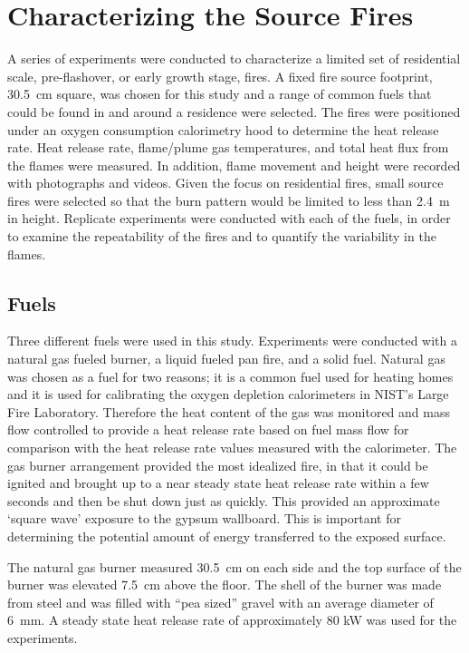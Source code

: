\documentclass[twoside]{uocthesis}
\begin{document}
{\chapter{Characterizing the Source Fires}
\label{chapter:Characterizing the Source Fires}

A series of experiments were conducted to characterize a limited set of  residential scale, pre-flashover, or early growth stage, fires.  A fixed fire source footprint, 30.5~cm square, was chosen for this study and a range of common fuels that could be found in and around a residence were selected.  The fires were positioned under an oxygen consumption calorimetry hood to determine the heat release rate.  Heat release rate, flame/plume gas temperatures, and total heat flux from the flames were measured.  In addition, flame movement and height were recorded with photographs and videos.  Given the focus on residential fires, small source fires were selected so that the burn pattern would be limited to less than 2.4~m in height.  Replicate experiments were conducted with each of the fuels, in order to examine the repeatability of the fires and to quantify the variability in the flames.

\section{Fuels}

Three different fuels were used in this study.  Experiments were conducted with a natural gas fueled burner, a liquid fueled pan fire, and a solid fuel. Natural gas was chosen as a fuel for two reasons; it is a common fuel used for heating homes and it is used for calibrating the oxygen depletion calorimeters in NIST’s Large Fire Laboratory.  Therefore the heat content of the gas was monitored and mass flow controlled to provide a heat release rate based on fuel mass flow for comparison with the heat release rate values measured with the calorimeter.  The gas burner arrangement provided the most idealized fire, in that it could be ignited and brought up to a near steady state heat release rate within a few seconds and then be shut down just as quickly.  This provided an approximate `square wave' exposure to the gypsum wallboard.  This is important for determining the potential amount of energy transferred to the exposed surface.

The natural gas burner measured 30.5~cm on each side and the top surface of the burner was elevated 7.5~cm above the floor. The shell of the burner was made from steel and was filled with ``pea sized'' gravel with an average diameter of 6~mm.  A steady state heat release rate of approximately 80 kW was used for the experiments.

}
\end{document}
